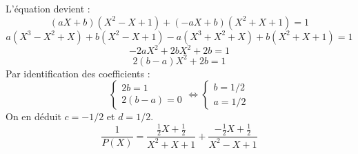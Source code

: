 {\begin{enumerate}
{			L'équation devient :
			$$ (aX+b)(X^2-X+1) + (-aX+b)(X^2+X+1) = 1 $$
			$$ a(X^3-X^2+X) + b(X^2-X+1) - a(X^3+X^2+X) + b(X^2+X+1) = 1 $$
			$$ -2aX^2 + 2bX^2 + 2b = 1 $$
			$$ 2(b-a)X^2 + 2b = 1 $$
			Par identification des coefficients :
			$$ \begin{cases} 2b = 1 \\ 2(b-a) = 0 \end{cases} \iff \begin{cases} b = 1/2 \\ a = 1/2 \end{cases} $$
			On en déduit $c = -1/2$ et $d = 1/2$.
			$$ \frac{1}{P(X)}=\frac{\frac{1}{2}X+\frac{1}{2}}{X^2+X+1}+\frac{-\frac{1}{2}X+\frac{1}{2}}{X^2-X+1} $$
		}
	\end{enumerate}
}